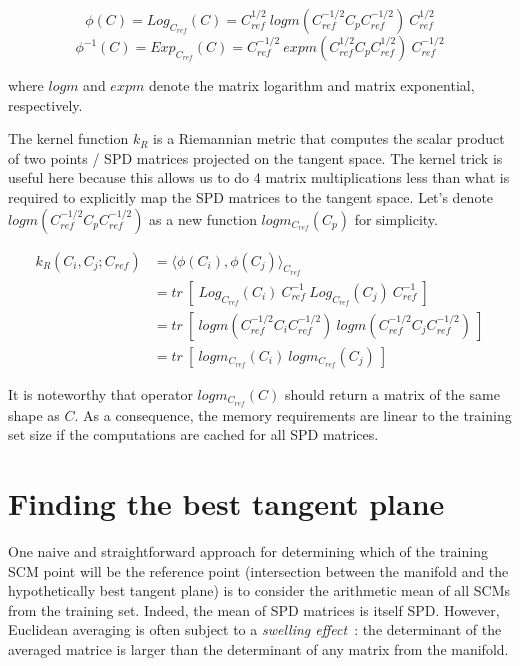 \documentclass[a4paper,11pt]{report}
\begin{document}
\begin{equation}
    \phi(C) = Log_{C_{ref}} (C) = C_{ref}^{1/2} \ logm(C_{ref}^{-1/2} C_p C_{ref}^{-1/2}) \ C_{ref}^{1/2}
\end{equation}
\begin{equation}
    \phi^{-1}(C) = Exp_{C_{ref}} (C) = C_{ref}^{-1/2} \ expm(C_{ref}^{1/2} C_p C_{ref}^{1/2}) \ C_{ref}^{-1/2}
\end{equation}

\noindent where $logm$ and $expm$ denote the matrix logarithm and matrix exponential, respectively.

The kernel function $k_R$ is a Riemannian metric that computes the scalar product of two points / SPD matrices projected
on the tangent space. The kernel trick is useful here because this allows us to do 4 matrix multiplications less than
what is required to explicitly map the SPD matrices to the tangent space.
Let's denote $logm(C_{ref}^{-1/2} C_p C_{ref}^{-1/2})$ as a new function $logm_{C_{ref}} (C_p)$ for simplicity.

\begin{align}
    k_R(C_i, C_j; C_{ref}) & = \langle \phi(C_i), \phi(C_j) \rangle_{C_{ref}} \\
    & = tr \ [\ Log_{C_{ref}} (C_i) \ C_{ref}^{-1} \ Log_{C_{ref}} (C_j) \ C_{ref}^{-1} \ ] \\
    & = tr \ [\ logm(C_{ref}^{-1/2} C_i C_{ref}^{-1/2}) \ logm(C_{ref}^{-1/2} C_j C_{ref}^{-1/2}) \ ] \\
    & = tr \ [\ logm_{C_{ref}} (C_i) \ logm_{C_{ref}} (C_j) \ ] 
\end{align}

It is noteworthy that operator $logm_{C_{ref}} (C)$ should return a matrix of the same shape as $C$.
As a consequence, the memory requirements are linear to the training set size if the computations
are cached for all SPD matrices.

\section{Finding the best tangent plane}

One naive and straightforward approach for determining which of the training SCM point will be the reference point
(intersection between the manifold and the hypothetically best tangent plane)
is to consider the arithmetic mean of all SCMs from the training set. Indeed, the mean of SPD matrices is itself
SPD. However, Euclidean averaging is often subject to a \textit{swelling effect}~\citep{doi:10.1137/050637996}: 
the determinant of the averaged matrice is larger than the determinant of any matrix from the manifold.
\end{document}
